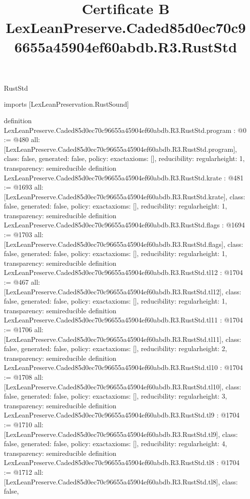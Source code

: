 \begin{lexlean}{RustStd}
\title{Certificate B LexLeanPreserve.Caded85d0ec70c96655a45904ef60abdb.R3.RustStd}
\begin{coremodule}
imports [LexLeanPreservation.RustSound]

definition LexLeanPreserve.Caded85d0ec70c96655a45904ef60abdb.R3.RustStd.program : @0 := @480 {
  all: [LexLeanPreserve.Caded85d0ec70c96655a45904ef60abdb.R3.RustStd.program],
  class: false,
  generated: false,
  policy: exact{axioms: []},
  reducibility: regular{height: 1},
  transparency: semireducible
}
definition LexLeanPreserve.Caded85d0ec70c96655a45904ef60abdb.R3.RustStd.krate : @481 := @1693 {
  all: [LexLeanPreserve.Caded85d0ec70c96655a45904ef60abdb.R3.RustStd.krate],
  class: false,
  generated: false,
  policy: exact{axioms: []},
  reducibility: regular{height: 1},
  transparency: semireducible
}
definition LexLeanPreserve.Caded85d0ec70c96655a45904ef60abdb.R3.RustStd.flags : @1694 := @1703 {
  all: [LexLeanPreserve.Caded85d0ec70c96655a45904ef60abdb.R3.RustStd.flags],
  class: false,
  generated: false,
  policy: exact{axioms: []},
  reducibility: regular{height: 1},
  transparency: semireducible
}
definition LexLeanPreserve.Caded85d0ec70c96655a45904ef60abdb.R3.RustStd.tl12 : @1704 := @467 {
  all: [LexLeanPreserve.Caded85d0ec70c96655a45904ef60abdb.R3.RustStd.tl12],
  class: false,
  generated: false,
  policy: exact{axioms: []},
  reducibility: regular{height: 1},
  transparency: semireducible
}
definition LexLeanPreserve.Caded85d0ec70c96655a45904ef60abdb.R3.RustStd.tl11 : @1704 := @1706 {
  all: [LexLeanPreserve.Caded85d0ec70c96655a45904ef60abdb.R3.RustStd.tl11],
  class: false,
  generated: false,
  policy: exact{axioms: []},
  reducibility: regular{height: 2},
  transparency: semireducible
}
definition LexLeanPreserve.Caded85d0ec70c96655a45904ef60abdb.R3.RustStd.tl10 : @1704 := @1708 {
  all: [LexLeanPreserve.Caded85d0ec70c96655a45904ef60abdb.R3.RustStd.tl10],
  class: false,
  generated: false,
  policy: exact{axioms: []},
  reducibility: regular{height: 3},
  transparency: semireducible
}
definition LexLeanPreserve.Caded85d0ec70c96655a45904ef60abdb.R3.RustStd.tl9 : @1704 := @1710 {
  all: [LexLeanPreserve.Caded85d0ec70c96655a45904ef60abdb.R3.RustStd.tl9],
  class: false,
  generated: false,
  policy: exact{axioms: []},
  reducibility: regular{height: 4},
  transparency: semireducible
}
definition LexLeanPreserve.Caded85d0ec70c96655a45904ef60abdb.R3.RustStd.tl8 : @1704 := @1712 {
  all: [LexLeanPreserve.Caded85d0ec70c96655a45904ef60abdb.R3.RustStd.tl8],
  class: false,
}
\end{coremodule}
\end{lexlean}
